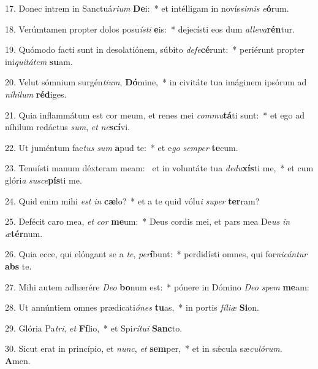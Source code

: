 17. Donec intrem in Sanctuá\textit{ri}\textit{um} \textbf{De}i:~*  et intélligam in novís\textit{si}\textit{mis} \textit{e}\textbf{ó}rum.\

18. Verúmtamen propter dolos posu\textit{ís}\textit{ti} \textbf{e}is:~*  dejecísti eos dum \textit{al}\textit{le}\textit{va}\textbf{rén}tur.\

19. Quómodo facti sunt in desolatiónem, súbito \textit{de}\textit{fe}\textbf{cé}runt:~*  periérunt propter ini\textit{qui}\textit{tá}\textit{tem} \textbf{su}am.\

20. Velut sómnium surgén\textit{ti}\textit{um}, \textbf{Dó}mine,~*  in civitáte tua imáginem ipsórum ad \textit{ní}\textit{hi}\textit{lum} \textbf{réd}iges.\

21. Quia inflammátum est cor meum, et renes mei \textit{com}\textit{mu}\textbf{tá}ti sunt:~*  et ego ad níhilum redáctus \textit{sum}, \textit{et} \textit{ne}\textbf{scí}vi.\

22. Ut juméntum fac\textit{tus} \textit{sum} \textbf{a}pud te:~*  et e\textit{go} \textit{sem}\textit{per} \textbf{te}cum.\

23. Tenuísti manum déxteram meam: \dag\  et in voluntáte tua \textit{de}\textit{du}\textbf{xís}ti me,~*  et cum glóri\textit{a} \textit{su}\textit{sce}\textbf{pís}ti me.\

24. Quid enim mihi \textit{est} \textit{in} \textbf{cæ}lo?~*  et a te quid vólu\textit{i} \textit{su}\textit{per} \textbf{ter}ram?\

25. Defécit caro mea, \textit{et} \textit{cor} \textbf{me}um:~*  Deus cordis mei, et pars mea De\textit{us} \textit{in} \textit{æ}\textbf{tér}num.\

26. Quia ecce, qui elóngant se a \textit{te}, \textit{per}\textbf{í}bunt:~*  perdidísti omnes, qui for\textit{ni}\textit{cán}\textit{tur} \textbf{abs} te.\

27. Mihi autem adhærére \textit{De}\textit{o} \textbf{bo}num est:~*  pónere in Dómino \textit{De}\textit{o} \textit{spem} \textbf{me}am:\

28. Ut annúntiem omnes prædicati\textit{ó}\textit{nes} \textbf{tu}as,~*  in portis \textit{fí}\textit{li}\textit{æ} \textbf{Si}on.\

29. Glória Pa\textit{tri}, \textit{et} \textbf{Fí}lio,~*  et Spi\textit{rí}\textit{tu}\textit{i} \textbf{Sanc}to.\

30. Sicut erat in princípio, et \textit{nunc}, \textit{et} \textbf{sem}per,~*  et in sǽcula sæ\textit{cu}\textit{ló}\textit{rum}. \textbf{A}men.\

